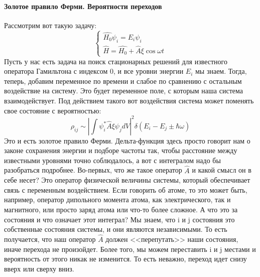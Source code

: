 \documentclass[12pt]{article}
\begin{document}
\paragraph{Золотое правило Ферми. Вероятности переходов}
Рассмотрим вот такую задачу:
\begin{equation*}
    \begin{cases}
    \hat{H_0}\psi_i=E_i\psi_i\\
    \hat{H}=\hat{H_0}+\hat{A}\xi \cos{\omega t}
    \end{cases}
\end{equation*}
Пусть у нас есть задача на поиск стационарных решений для известного оператора Гамильтона с индексом 0, и все уровни энергии $E_i$ мы знаем. Тогда, теперь, добавим переменное по времени и слабое по сравнению с остальным воздействие на систему. Это будет переменное поле, с которым наша система взаимодействует. Под действием такого вот воздействия система может поменять свое состояние с вероятностью:
\begin{equation*}
    \rho_{ij} \sim \left| \int \psi^*_i\hat{A}\xi\psi_j dV\right|^2 \delta (E_i-E_j \pm \hbar \omega)
\end{equation*}
Это и есть золотое правило Ферми. Дельта-функция здесь просто говорит нам о законе сохранения энергии и подборе частоты так, чтобы расстояние между известными уровнями точно соблюдалось, а вот с интегралом надо бы разобраться подробнее. Во-первых, что же такое оператор $\hat{A}$ и какой смысл он в себе несет? Это оператор физической величины системы, который обеспечивает связь с переменным воздействием. Если говорить об атоме, то это может быть, например, оператор дипольного момента атома, как электрического, так и магнитного, или просто заряд атома или что-то более сложное. А что это за состояния и что означает этот интеграл? Мы знаем, что i и j состояния это собственные состояния системы, и они являются независимыми. То есть получается, что наш оператор $\hat{A}$ должен <<перепутать>> наши состояния, иначе перехода не произойдет. Более того, мы можем переставить i и j местами и вероятность от этого никак не изменится. То есть неважно, переход идет снизу вверх или сверху вниз.
\end{document}
